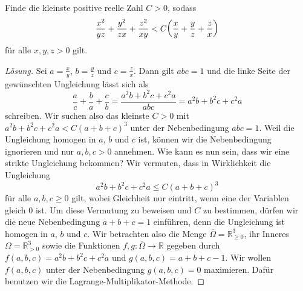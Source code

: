 \begin{aufgabe*}\label{aufgabe:MatBoj2014Lagrange}
	Finde die kleinste positive reelle Zahl $C>0$, sodass
	\begin{equation*}
		\frac{x^2}{yz}+\frac{y^2}{zx}+\frac{z^2}{xy}<C\parens*{\frac{x}{y}+\frac{y}{z}+\frac{z}{x}}
	\end{equation*}
	für alle $x,y,z>0$ gilt.
\end{aufgabe*}
\begin{proof}[Lösung]
	Sei $a=\frac xy$, $b=\frac yz$ und $c=\frac zx$. Dann gilt $abc=1$ und die linke Seite der gewünschten Ungleichung lässt sich als
	\begin{equation*}
		\frac{a}{c}+\frac{b}{a}+\frac{c}{b}=\frac{a^2b+b^2c+c^2a}{abc}=a^2b+b^2c+c^2a
	\end{equation*}
	schreiben. Wir suchen also das kleinste $C>0$ mit $a^2b+b^2c+c^2a<C(a+b+c)^3$ unter der Nebenbedingung $abc=1$. Weil die Ungleichung homogen in $a$, $b$ und $c$ ist, können wir die Nebenbedingung ignorieren und nur $a,b,c>0$ annehmen. Wie kann es nun sein, dass wir eine strikte Ungleichung bekommen? Wir vermuten, dass in Wirklichkeit die Ungleichung
	\begin{equation*}
		a^2b+b^2c+c^2a\leqslant C(a+b+c)^3
	\end{equation*}
	für alle $a,b,c\geqslant 0$ gilt, wobei Gleichheit nur eintritt, wenn eine der Variablen gleich $0$ ist. Um diese Vermutung zu beweisen und $C$ zu bestimmen, dürfen wir die neue Nebenbedingung $a+b+c=1$ einführen, denn die Ungleichung ist homogen in $a$, $b$ und $c$. Wir betrachten also die Menge $\overline{\Omega}=\mathbb R_{\geqslant 0}^3$, ihr Inneres $\Omega=\mathbb R_{>0}^3$ sowie die Funktionen $f,g\colon \overline{\Omega}\rightarrow \mathbb R$ gegeben durch $f(a,b,c)=a^2b+b^2c+c^2a$ und $g(a,b,c)=a+b+c-1$. Wir wollen $f(a,b,c)$ unter der Nebenbedingung $g(a,b,c)=0$ maximieren. Dafür benutzen wir die Lagrange-Multiplikator-Methode.
	

\end{proof}
